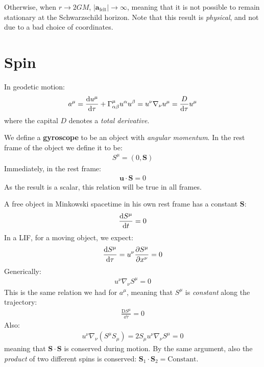 \documentclass[../template.tex]{subfiles}
\begin{document}
\begin{example}
    Otherwise, when $r \to 2GM$, $|\bm{a}_{\mathrm{felt} }| \to \infty$, meaning that it is not possible to remain stationary at the Schwarzschild horizon. Note that this result is \textit{physical}, and not due to a bad choice of coordinates.   

\end{example}


\section{Spin}
In geodetic motion:
\begin{align*}
    a^\mu = \dv{u^\mu}{\tau} + \Gamma^\mu_{\alpha \beta} u^\alpha u^\beta = u^\nu \nabla_\nu u^\mu = \frac{D}{\dd{\tau}} u^\mu 
\end{align*}
where the capital $D$ denotes a \textit{total derivative}.

We define a \textbf{gyroscope} to be an object with \textit{angular momentum}. In the rest frame of the object we define it to be:
\begin{align*}
    S^\mu = (0, \bm{S})
\end{align*}  
Immediately, in the rest frame:
\begin{align*}
    \bm{u}\cdot \bm{S} = 0
\end{align*}
As the result is a scalar, this relation will be true in all frames.

A free object in Minkowski spacetime in his own rest frame has a constant $\bm{S}$:
\begin{align*}
    \dv{S^\mu}{t} = 0
\end{align*} 
In a LIF, for a moving object, we expect:
\begin{align*}
    \dv{S^\mu}{\tau} = u^\nu \pdv{S^\mu}{x^\nu} = 0
\end{align*}
Generically:
\begin{align*}
    u^\nu\nabla_\nu S^\mu = 0 
\end{align*}
This is the same relation we had for $a^\mu$, meaning that $S^\mu$ is \textit{constant} along the trajectory:
\begin{align*}
    \frac{\mathrm{D} S^\mu}{\dd{\tau}}  = 0
\end{align*}   
Also:
\begin{align*}
    u^\nu \nabla_\nu (S^\mu S_\mu) = 2S_\mu u^\nu \nabla_\nu S^\mu = 0
\end{align*}
meaning that $\bm{S} \cdot \bm{S}$ is conserved during motion. By the same argument, also the \textit{product} of two different spins is conserved: $\bm{S}_1 \cdot \bm{S}_2 = \text{Constant}$.
\end{document}
